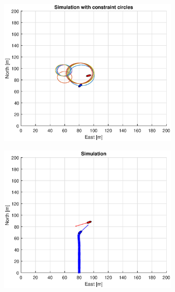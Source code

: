 \begin{figure}[ht]
\begin{subfigure}[b]{0.499\textwidth}
    \end{subfigure}
    \hfill
    \\
    \begin{subfigure}[b]{0.49\textwidth}
        \centering
        \includegraphics[width=\textwidth]{Images/Figures/sving_GW/Simple0_f1_Frame5}
    \end{subfigure}
    \hfill
    \begin{subfigure}[b]{0.499\textwidth}
        \centering
        \includegraphics[width=\textwidth]{Images/Figures/sving_GW/Simple0_f600_Frame5}

\end{subfigure}
\end{figure}
